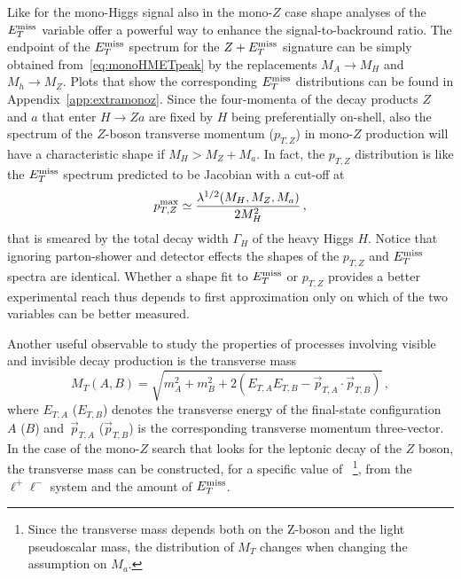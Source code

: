 Like for the mono-Higgs signal also in the mono-$Z$ case shape analyses of the~$E_T^\mathrm{miss}$ variable offer a powerful way to enhance the signal-to-backround ratio. The endpoint of the $E_T^\mathrm{miss}$ spectrum for the $Z+E_T^\mathrm{miss}$ signature can be simply obtained from~\eqref{eq:monoHMETpeak} by the replacements $M_A \to M_H$ and $M_h \to M_Z$. Plots that show the corresponding $E_T^\mathrm{miss}$ distributions can be found in Appendix~\ref{app:extramonoz}. Since the four-momenta of the decay products $Z$ and $a$ that enter $H \to Za$ are fixed by $H$ being preferentially on-shell, also the spectrum of the $Z$-boson transverse momentum ($p_{T,Z}$) in mono-$Z$ production will have a characteristic shape if $M_H > M_Z + M_a$. In fact,  the $p_{T,Z}$ distribution is like the $E_T^\mathrm{miss}$ spectrum predicted  to be Jacobian with a cut-off at~\cite{No:2015xqa,Bauer:2017ota}
\begin{equation} \label{eq:monoZpTpeak}
p_{T,Z}^{ {\rm max} } \simeq \frac{\lambda^{1/2}(M_H, M_Z, M_a)}{2 M_H^2}\,,
\end{equation}
that is smeared by the total decay width $\Gamma_H$ of the heavy Higgs $H$. Notice that  ignoring parton-shower and detector effects the shapes of the $p_{T,Z}$ and $E_T^\mathrm{miss}$ spectra are identical. Whether a shape fit to $E_T^\mathrm{miss}$ or $p_{T,Z}$ provides a better experimental reach thus depends to first approximation only on which of the two variables can be better measured.

Another useful observable to study the properties of processes involving visible and invisible decay production is the transverse mass 
\begin{equation} \label{eq:transversemass}
M_T (A,B) = \sqrt{m_A^2+m_B^2 + 2 \left (E_{T,A} E_{T,B} - \vec{p}_{T,A} \cdot \vec{p}_{T,B} \right )} \,,
\end{equation}
where $E_{T,A}$ ($E_{T,B}$) denotes the transverse energy of the final-state configuration $A$ ($B$) and~$\vec{p}_{T,A}$  ($\vec{p}_{T,B}$) is the corresponding transverse momentum three-vector. In the case of the mono-$Z$ search that looks for the leptonic decay of the $Z$ boson, the transverse mass can be constructed, for a specific value of \ma~\footnote{Since the transverse mass depends both on the Z-boson and the light pseudoscalar mass, the distribution of $M_T$ changes when changing the assumption on $M_a$.}, from the $\ell^+ \ell^-$ system and the amount of $E_T^\mathrm{miss}$.  

